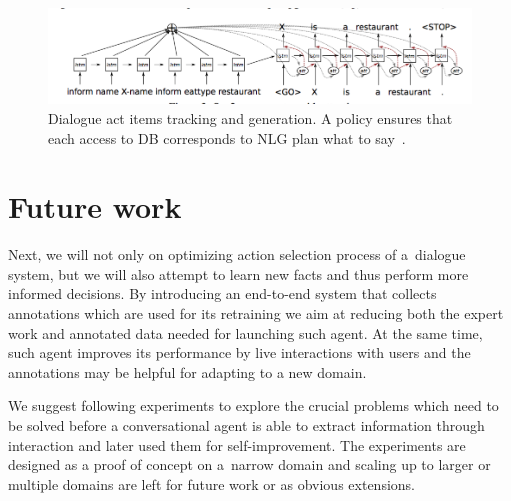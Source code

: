 \documentclass[11pt]{article}
\begin{document}
\begin{figure}[tb]
    \centering
    \includegraphics[width=1.0\linewidth]{dusek_seq2seq}
    \caption{Dialogue act items tracking and generation. A policy ensures that each access to DB corresponds to NLG plan what to say~\cite{dusek_sequence2sequence_2016}.}
    \label{fig:dai_gen}
\end{figure}

\section{Future work}\label{sec:future}

Next, we will not only on optimizing action selection process of a~dialogue system, but we will also attempt to learn new facts and thus perform more informed decisions.
By introducing an end-to-end system that collects annotations which are used for its retraining we aim at reducing both the expert work and annotated data needed for launching such agent.
At the same time, such agent improves its performance by live interactions with users and the annotations may be helpful for adapting to a new domain.

We suggest following experiments to explore the crucial problems which need to be solved before a conversational agent is able to extract information through interaction and later used them for self-improvement.
The experiments are designed as a proof of concept on a~narrow domain and scaling up to larger or multiple domains are left for future work or as obvious extensions. 
\end{document}
